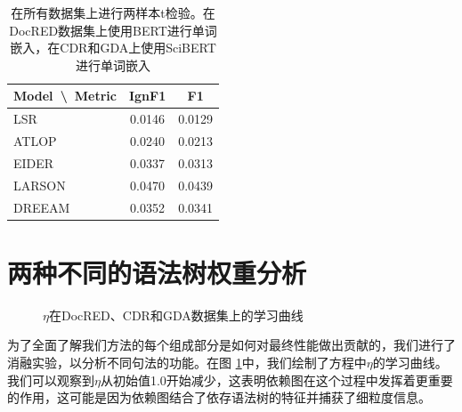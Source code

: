 \documentclass[bachelor]{thesis-uestc}
\begin{document}
\begin{table}[]
    \caption{在所有数据集上进行两样本t检验。在DocRED数据集上使用BERT进行单词嵌入，在CDR和GDA上使用SciBERT进行单词嵌入}
    \begin{tabular}{lcc}
    \hline
    Model\ \textbackslash \ Metric       & IgnF1            & F1            \\ \hline
    LSR\cite{nan-etal-2020-reasoning}       & 0.0146           & 0.0129           \\
    ATLOP\cite{zhou2021document}  & 0.0240           & 0.0213           \\
    EIDER\cite{xie2022eider}  & 0.0337          & 0.0313          \\
    LARSON\cite{duan-etal-2022-just} & 0.0470          &   0.0439            \\ 
    DREEAM\cite{ma-etal-2023-DREEAM} &   0.0352        &   0.0341            \\ \hline
    \end{tabular}
    \label{p}
    \end{table} 

\section{两种不同的语法树权重分析}\label{sec:weight}

\begin{figure}[!t]
    \caption{$\eta$在DocRED、CDR和GDA数据集上的学习曲线}
    \label{fig_learning}
\end{figure}
为了全面了解我们方法的每个组成部分是如何对最终性能做出贡献的，我们进行了消融实验，以分析不同句法的功能。在图 \ref{fig_learning}中，我们绘制了方程中$\eta$的学习曲线。我们可以观察到$\eta$从初始值1.0开始减少，这表明依赖图在这个过程中发挥着更重要的作用，这可能是因为依赖图结合了依存语法树的特征并捕获了细粒度信息。 \par
\end{document}
